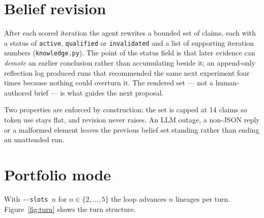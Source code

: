 \documentclass[11pt,a4paper]{article}
\newcommand{\code}[1]{\texttt{#1}}
\newcommand{\file}[1]{\texttt{#1}}
\begin{document}
\section{Belief revision}
\label{sec:beliefs}

After each scored iteration the agent rewrites a bounded set of claims, each with a status of
\code{active}, \code{qualified} or \code{invalidated} and a list of supporting iteration numbers
(\file{knowledge.py}). The point of the status field is that later evidence can \emph{demote} an
earlier conclusion rather than accumulating beside it; an append-only reflection log produced runs
that recommended the same next experiment four times because nothing could overturn it. The
rendered set --- not a human-authored brief --- is what guides the next proposal.

Two properties are enforced by construction: the set is capped at 14 claims so token use stays
flat, and revision never raises. An LLM outage, a non-JSON reply or a malformed element leaves the
previous belief set standing rather than ending an unattended run.

\section{Portfolio mode}
\label{sec:portfolio}

With \code{-{}-slots $n$} for $n \in \{2,\dots,5\}$ the loop advances $n$ lineages per turn.
Figure~\ref{fig:turn} shows the turn structure.
\end{document}
